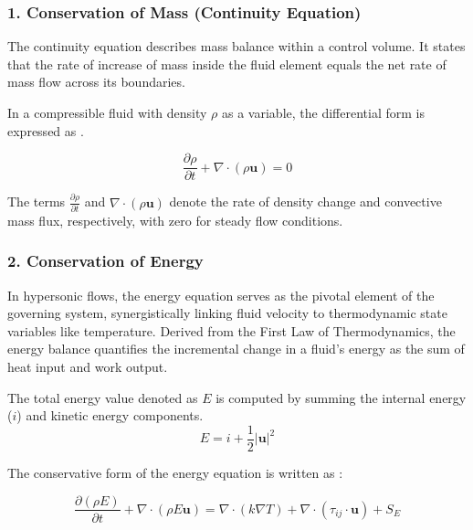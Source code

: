 \subsubsection*{1. Conservation of Mass (Continuity Equation)}
The continuity equation describes mass balance within a control volume. It states that the rate of increase of mass inside the fluid element equals the net rate of mass flow across its boundaries.
\par
In a compressible fluid with density $\rho$ as a variable, the differential form is expressed as \cite{versteeg2007cfd}.

\begin{equation}
    \frac{\partial \rho}{\partial t} + \nabla \cdot (\rho \mathbf{u}) = 0
\end{equation}

The terms $\frac{\partial \rho}{\partial t}$ and $\nabla \cdot (\rho \mathbf{u})$ denote the rate of density change and convective mass flux, respectively, with zero for steady flow conditions.

\subsubsection*{2. Conservation of Energy}
In hypersonic flows, the energy equation serves as the pivotal element of the governing system, synergistically linking fluid velocity to thermodynamic state variables like temperature. Derived from the First Law of Thermodynamics, the energy balance quantifies the incremental change in a fluid's energy as the sum of heat input and work output.

The total energy value denoted as $E$ is computed by summing the internal energy ($i$) and kinetic energy components.
\begin{equation}
    E = i + \frac{1}{2} |\mathbf{u}|^2
\end{equation}

The conservative form of the energy equation is written as \cite{versteeg2007cfd}:

\begin{equation}
    \frac{\partial (\rho E)}{\partial t} + \nabla \cdot (\rho E \mathbf{u}) = \nabla \cdot (k \nabla T) + \nabla \cdot (\tau_{ij} \cdot \mathbf{u}) + S_E
\end{equation}

